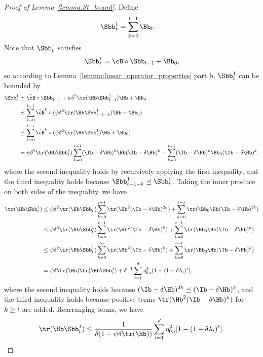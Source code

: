 \documentclass[11pt]{article}
\begin{document}
\begin{proof}[Proof of Lemma~\ref{lemma:St_bound}]
Define
\begin{align*}
\Sbb_t^1&=\sum_{k=0}^{t-1}\Bb_t.
\end{align*}
Note that $\Sbb_t^1$ satisfies
\begin{align*}
\Sbb_t^1=\cB\circ\Sbb_{t-1}+\Bb_0,
\end{align*}
so according to Lemma~\ref{lemma:linear_operator_properties} part b, $\Sbb_t^1$ can be bounded by
\begin{align*}
\Sbb_t^1&\preceq\tilde\cB\circ\Sbb_{t-1}^1+\psi\delta^2\tr(\Hb\Sbb_{t-1}^1)\Hb+\Bb_0\\
&\preceq\sum_{k=0}^{t-1}\tilde\cB^k\circ(\psi\delta^2\tr(\Hb\Sbb_{t-1-k}^1)\Hb+\Bb_0)\\
&\preceq\sum_{k=0}^{t-1}\tilde\cB^k\circ(\psi\delta^2\tr(\Hb\Sbb_t^1)\Hb+\Bb_0)\\
&=\psi\delta^2\tr(\Hb\Sbb_t^1)\sum_{k=0}^{t-1}(\Ib-\delta\Hb)^k\Hb(\Ib-\delta\Hb)^k+\sum_{k=0}^{t-1}(\Ib-\delta\Hb)^k\Bb_0(\Ib-\delta\Hb)^k,
\end{align*}
where the second inequality holds by recursively applying the first inequality, and the third inequality holds because $\Sbb_{t-1-k}^1\preceq\Sbb_t^1$. Taking the inner produce on both sides of the inequality, we have
\begin{align*}
\tr(\Hb\Sbb_t^1)&\le\psi\delta^2\tr(\Hb\Sbb_t^1)\sum_{k=0}^{t-1}\tr(\Hb^2(\Ib-\delta\Hb)^{2k})+\sum_{k=0}^{t-1}\tr(\Bb_0\Hb(\Ib-\delta\Hb)^{2k})\\
&\le\psi\delta^2\tr(\Hb\Sbb_t^1)\sum_{k=0}^{t-1}\tr(\Hb^2(\Ib-\delta\Hb)^k)+\sum_{k=0}^{t-1}\tr(\Bb_0\Hb(\Ib-\delta\Hb)^k)\\
&\le\psi\delta^2\tr(\Hb\Sbb_t^1)\sum_{k=0}^{\infty}\tr(\Hb^2(\Ib-\delta\Hb)^k)+\sum_{k=0}^{t-1}\tr(\Bb_0\Hb(\Ib-\delta\Hb)^k)\\
&=\psi\delta\tr(\Hb)\tr(\Hb\Sbb_t^1)+\delta^{-1}\sum_{i=1}^d\eta_{0, i}^2(1-(1-\delta\lambda_i)^t),
\end{align*}
where the second inequality holds because $(\Ib-\delta\Hb)^{2k}\preceq(\Ib-\delta\Hb)^k$, and the third inequality holds because positive terms $\tr(\Hb^2(\Ib-\delta\Hb)^k)$ for $k\ge t$ are added. Rearranging terms, we have
\begin{align*}
\tr(\Hb\Sbb_t^1)\le\frac{1}{\delta(1-\psi\delta\tr(\Hb))}\sum_{i=1}^d\eta_{0, i}^2[1-(1-\delta\lambda_i)^t].
\end{align*}
\end{proof}
\end{document}
